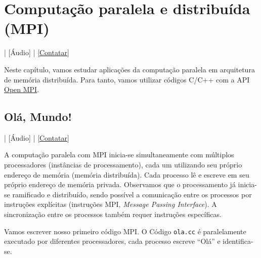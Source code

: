 
\chapter{Computação paralela e distribuída (MPI)}\label{cap_mpi}
\thispagestyle{fancy}

\begin{flushright}
  [Vídeo] | [Áudio] | \href{https://phkonzen.github.io/notas/contato.html}{[Contatar]}
\end{flushright}

Neste capítulo, vamos estudar aplicações da computação paralela em arquitetura de memória distribuída. Para tanto, vamos utilizar códigos C/C++ com a API \href{https://www.open-mpi.org/}{Open MPI}.

\section{Olá, Mundo!}\label{cap_mpi_sec_ola}

\begin{flushright}
  [Vídeo] | [Áudio] | \href{https://phkonzen.github.io/notas/contato.html}{[Contatar]}
\end{flushright}

A computação paralela com MPI inicia-se simultaneamente com múltiplos processadores (instâncias de processamento), cada um utilizando seu próprio endereço de memória (memória distribuída). Cada processo lê e escreve em seu próprio endereço de memória privada. Observamos que o processamento já inicia-se ramificado e distribuído, sendo possível a comunicação entre os processos por instruções explícitas (instruções MPI, {\it Message Passing Interface}). A sincronização entre os processos também requer instruções específicas.

Vamos escrever nosso primeiro código MPI. O Código \verb+ola.cc+ é paralelamente executado por diferentes processadores, cada processo escreve ``Olá'' e identifica-se.



